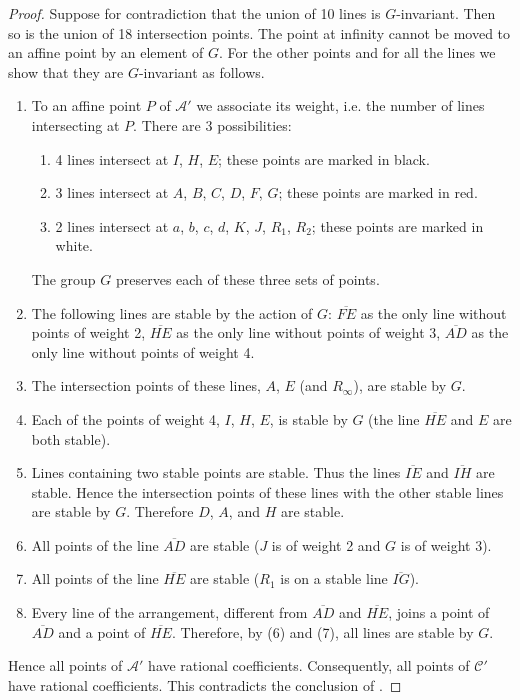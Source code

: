 \documentclass[12pt]{amsart}
\theoremstyle{definition}
\numberwithin{equation}{section}
\begin{document}
\begin{proof} 
Suppose for contradiction that the union of 10 lines is $G$-invariant.  Then so is the union of 18 intersection points.  The point at infinity cannot be moved to an affine point by an element of $G$.  For the other points and for all the lines we show that they are $G$-invariant as follows.
\begin{enumerate}
\item
To an affine point $P$ of $\mathcal A'$ we associate its weight, i.e. the number of lines intersecting at $P$.  There are 3 possibilities: 
\begin{enumerate}
\item
4 lines intersect at $I$, $H$, $E$;  these points are marked in black.
\item
3 lines intersect at $A$, $B$, $C$, $D$, $F$, $G$;  these points are marked in red.
\item
2 lines intersect at $a$, $b$, $c$, $d$, $K$, $J$, $R_1$, $R_2$;  these points are marked in white.
\end{enumerate}
The group $G$ preserves each of these three sets of points. 
\item
The following lines are stable by the action of $G$:  $\overline{FE}$ as the only line without points of  
weight 2,  $\overline{HE}$ as the only line without points of weight 3, $\overline{AD}$ as the only line without points of weight 4.
\item
The intersection points of these lines, $A$, $E$ (and $R_\infty$), are stable by $G$.
\item
Each of the points of weight 4, $I$, $H$, $E$, is stable by $G $ (the line $\overline{HE}$ and $E$ are both stable).  
\item
Lines containing two stable points are stable.  Thus the lines $\overline{IE}$ and 
$\overline{IH}$ are stable.  Hence the intersection points of these lines with the other stable lines are stable by $G$.  Therefore $D$, $A$, and $H$ are stable. 
\item
All points of the line $\overline{AD}$ are stable ($J$ is of weight 2 and $G$ is of weight $3$).
\item
All points of the line $\overline{HE}$ are stable ($R_1$ is on a stable line $\overline{IG}$).
\item
Every line of the arrangement, different from $\overline{AD}$ and  $\overline{HE}$,  joins a point of $\overline{AD}$ and a point of $\overline{HE}$.  Therefore, by (6) and (7), all lines are stable by $G$. 
\end{enumerate}
Hence all points of $\mathcal A'$ have rational coefficients. Consequently,  all points of  $\mathcal C'$ have rational coefficients.  This contradicts the conclusion of \cite[Theorem 2.28 and the discussion on page 34]{Grunpaper}.  
\end{proof} 
\end{document}
